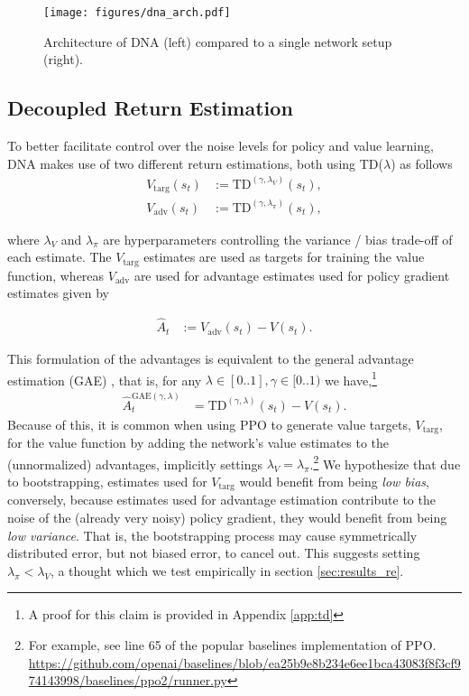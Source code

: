\documentclass{article}
\newcommand{\vt}[0]{\ensuremath{V_\text{targ}}\xspace}
\newcommand{\lp}[0]{\ensuremath{\lambda_\pi}}
\newcommand{\lv}[0]{\ensuremath{\lambda_V}}
\begin{document}
\begin{figure}[t]
    \centering
    \texttt{[image: figures/dna\_arch.pdf]}
    \caption{Architecture of DNA (left) compared to a single network setup (right).}
    \label{fig:dna_arch}
\end{figure}



\subsection{Decoupled Return Estimation}

To better facilitate control over the noise levels for policy and value learning, DNA makes use of two different return estimations, both using TD($\lambda$) \cite{sutton1988learning} as follows
\begin{align}
    V_\text{targ}(s_t) &:= \text{TD}^{(\gamma, \lambda_V)}(s_t), \\
    V_\text{adv}(s_t) &:= \text{TD}^{(\gamma, \lambda_\pi)}(s_t),
\end{align}

where $\lambda_V$ and $\lambda_\pi$ are hyperparameters controlling the variance / bias trade-off of each estimate. The $V_\text{targ}$ estimates are used as targets for training the value function, whereas $V_\text{adv}$ are used for advantage estimates used for policy gradient estimates given by



\begin{align}
\hat{A}_t &:= V_\text{adv}(s_t) - V(s_t).
\end{align}

This formulation of the advantages is equivalent to the general advantage estimation (GAE) \cite{schulman2015high}, that is, for any $\lambda \in [0..1], \gamma \in [0..1)$  we have,\footnote{A proof for this claim is provided in Appendix \ref{app:td}}
\begin{align}
    \hat{A}_t^{\text{GAE}(\gamma, \lambda)} &= \text{TD}^{(\gamma, \lambda)}(s_t) - V(s_t).
\end{align}
Because of this, it is common when using PPO to generate value targets, $V_\text{targ}$, for the value function by adding the network's value estimates to the (unnormalized) advantages, implicitly settings $\lv=\lp$.\footnote{For example, see line 65 of the popular baselines implementation of PPO. \url{https://github.com/openai/baselines/blob/ea25b9e8b234e6ee1bca43083f8f3cf974143998/baselines/ppo2/runner.py} } We hypothesize that due to bootstrapping, estimates used for \vt would benefit from being \textit{low bias}, conversely, because estimates used for advantage estimation contribute to the noise of the (already very noisy) policy gradient, they would benefit from being \textit{low variance}. That is, the bootstrapping process may cause symmetrically distributed error, but not biased error, to cancel out. This suggests setting $\lp < \lv$, a thought which we test empirically in section \ref{sec:results_re}.
\end{document}
